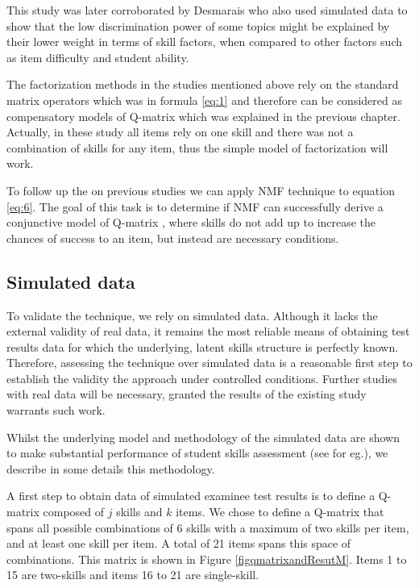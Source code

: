 This study was later corroborated by Desmarais \citep{desmarais2011conditions} who also used simulated data to show that the low discrimination power of some topics might be explained by their lower weight in terms of skill factors, when compared to other factors such as item difficulty and student ability.

The factorization methods in the studies mentioned above rely on the standard matrix operators which was in formula \ref{eq:1} and therefore can be considered as compensatory models of Q-matrix which was explained in the previous chapter. Actually, in these study all items rely on one skill and there was not a combination of skills for any item, thus the simple model of factorization will work. 

To follow up the on previous studies \citep{Barnes2005,desmarais2011conditions,Winters07} we can apply NMF technique to equation \ref{eq:6}. The goal of this task is to determine if NMF can successfully derive a conjunctive model of Q-matrix , where skills do not add up to increase the chances of success to an item, but instead are necessary conditions.


\subsection{Simulated data}

To validate the technique, we rely on simulated data. Although it lacks the external validity of real data, it remains the most reliable means of obtaining test results data for which the underlying, latent skills structure is perfectly known. Therefore, assessing the technique over simulated data is a reasonable first step to establish the validity the approach under controlled conditions. Further studies with real data will be necessary, granted the results of the existing study warrants such work.

Whilst the underlying model and methodology of the simulated data are shown to make substantial performance of student skills assessment (see \citep{Desmarais2010a} for eg.), we describe in some details this methodology. 

A first step to obtain data of simulated examinee test results is to define a Q-matrix composed of $j$ skills and $k$ items. We chose to define a Q-matrix that spans all possible combinations of 6 skills with a maximum of two skills per item, and at least one skill per item. A total of 21 items spans this space of combinations. This matrix is shown in Figure \ref{figqmatrixandResutM}. Items 1 to 15 are two-skills and items 16 to 21 are single-skill. 

